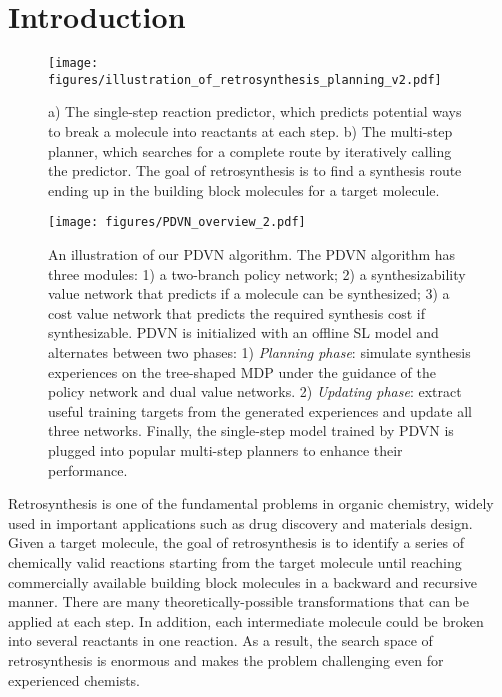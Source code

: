 \documentclass[nohyperref]{article}
\theoremstyle{plain}
\theoremstyle{definition}
\theoremstyle{remark}
\begin{document}
\section{Introduction}

\begin{figure}[t]
\centerline{\texttt{[image: figures/illustration\_of\_retrosynthesis\_planning\_v2.pdf]}}
\caption{
a) The single-step reaction predictor, which predicts potential ways to break a molecule into reactants at each step. 
b) The multi-step planner, which searches for a complete route by iteratively calling the predictor.
The goal of retrosynthesis is to find a synthesis route ending up
in the building block molecules for a target molecule. 
}
\label{fig:retrosynthesis}
\end{figure}








\begin{figure*}[t]
\centerline{\texttt{[image: figures/PDVN\_overview\_2.pdf]}}
\caption{
An illustration of our PDVN algorithm. 
The PDVN algorithm has three modules: 
1) a two-branch policy network;
2) a synthesizability value network that predicts if a molecule can be synthesized;
3) a cost value network that predicts the required synthesis cost if synthesizable.
PDVN is initialized with an offline SL model and alternates between two phases: 
1) \textit{Planning phase}: 
simulate synthesis experiences on the tree-shaped MDP under the guidance of the policy network and dual value networks. 
2) \textit{Updating phase}: extract useful training targets from the generated experiences and update all three networks.
Finally, the single-step model trained by PDVN is plugged into popular multi-step planners to enhance their performance. 
}
\label{fig:framework}
\end{figure*}

Retrosynthesis is one of the fundamental problems in organic chemistry, widely used in important applications such as drug discovery and materials design.
Given a target molecule, the goal of retrosynthesis is to identify a series of chemically valid reactions  starting from the target molecule until reaching commercially available building block molecules in a backward and recursive manner.
There are many theoretically-possible transformations that can be applied 
at each step. 
In addition, each intermediate molecule could be broken into several reactants in one reaction.  
As a result, the search space of retrosynthesis is enormous and makes the problem challenging even for experienced chemists.
\end{document}

